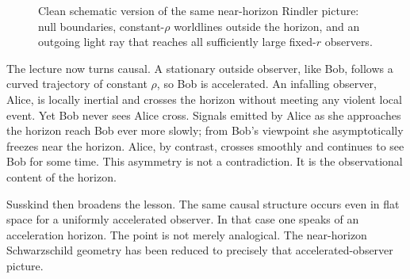 \begin{figure}[h]
\centering
{}
\caption{Clean schematic version of the same near-horizon Rindler picture: null boundaries, constant-\(\rho\) worldlines outside the horizon, and an outgoing light ray that reaches all sufficiently large fixed-\(r\) observers.}
\end{figure}

The lecture now turns causal. A stationary outside observer, like Bob, follows a curved trajectory of constant \(\rho\), so Bob is accelerated. An infalling observer, Alice, is locally inertial and crosses the horizon without meeting any violent local event. Yet Bob never sees Alice cross. Signals emitted by Alice as she approaches the horizon reach Bob ever more slowly; from Bob's viewpoint she asymptotically freezes near the horizon. Alice, by contrast, crosses smoothly and continues to see Bob for some time. This asymmetry is not a contradiction. It is the observational content of the horizon.

Susskind then broadens the lesson. The same causal structure occurs even in flat space for a uniformly accelerated observer. In that case one speaks of an acceleration horizon. The point is not merely analogical. The near-horizon Schwarzschild geometry has been reduced to precisely that accelerated-observer picture.

